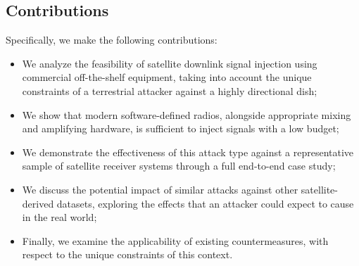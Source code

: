 \subsection{Contributions}

Specifically, we make the following contributions:

\begin{itemize}
    \item We analyze the feasibility of satellite downlink signal injection using commercial off-the-shelf equipment, taking into account the unique constraints of a terrestrial attacker against a highly directional dish;
    \item We show that modern software-defined radios, alongside appropriate mixing and amplifying hardware, is sufficient to inject signals with a low budget;
    \item We demonstrate the effectiveness of this attack type against a representative sample of satellite receiver systems through a full end-to-end case study;
    \item We discuss the potential impact of similar attacks against other satellite-derived datasets, exploring the effects that an attacker could expect to cause in the real world;
    \item Finally, we examine the applicability of existing countermeasures, with respect to the unique constraints of this context.
\end{itemize}
